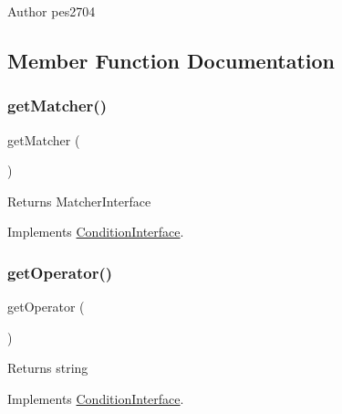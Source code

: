 \begin{DoxyAuthor}{Author}
pes2704 
\end{DoxyAuthor}


\subsection{Member Function Documentation}
\mbox{\label{class_pes_1_1_query_1_1_condition_aad4538bdde7e273b32661681773c32f0}} 
\subsubsection{\texorpdfstring{get\+Matcher()}{getMatcher()}}
{\footnotesize\ttfamily get\+Matcher (\begin{DoxyParamCaption}{ }\end{DoxyParamCaption})}

\begin{DoxyReturn}{Returns}
Matcher\+Interface 
\end{DoxyReturn}


Implements \mbox{\hyperlink{interface_pes_1_1_query_1_1_condition_interface_aad4538bdde7e273b32661681773c32f0}{Condition\+Interface}}.

\mbox{\label{class_pes_1_1_query_1_1_condition_aeb1d8b550b38454a92508c857b043df5}} 
\subsubsection{\texorpdfstring{get\+Operator()}{getOperator()}}
{\footnotesize\ttfamily get\+Operator (\begin{DoxyParamCaption}{ }\end{DoxyParamCaption})}

\begin{DoxyReturn}{Returns}
string 
\end{DoxyReturn}


Implements \mbox{\hyperlink{interface_pes_1_1_query_1_1_condition_interface}{Condition\+Interface}}.

